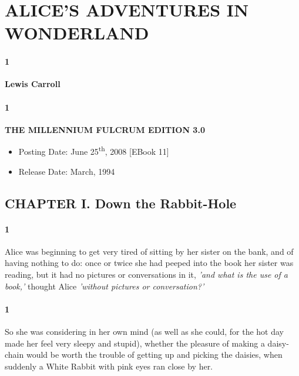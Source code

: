 \documentclass[12pt]{article}
\begin{document}

\section{ALICE'S ADVENTURES IN WONDERLAND}

\paragraph{1} \textbf{Lewis Carroll}

\paragraph{1} \textbf{THE MILLENNIUM FULCRUM EDITION 3.0}

\begin{itemize}

\item Posting Date: June 25\textsuperscript{th}, 2008 [EBook 11]

\item Release Date: March, 1994

\end{itemize}


\subsection{CHAPTER I. Down the Rabbit-Hole}

\paragraph{1} Alice was beginning to get very tired of sitting by her sister on the
bank, and of having nothing to do: once or twice she had peeped into the
book her sister was reading, but it had no pictures or conversations in
it, \textit{'and what is the use of a book,'} thought Alice \textit{'without pictures or
    conversation?'}


\paragraph{1} So she was considering in her own mind (as well as she could, for the
hot day made her feel very sleepy and stupid), whether the pleasure
of making a daisy-chain would be worth the trouble of getting up and
picking the daisies, when suddenly a White Rabbit with pink eyes ran
close by her.
\end{document}
